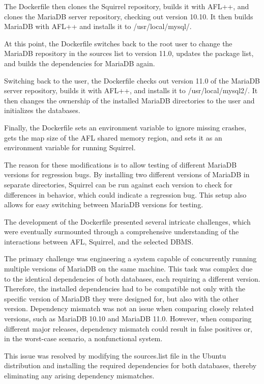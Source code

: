 \documentclass[sigconf]{acmart}
\begin{document}
The Dockerfile then clones the Squirrel repository, builds it with AFL++, and clones the MariaDB server repository, checking out version 10.10. It then builds MariaDB with AFL++ and installs it to /usr/local/mysql/.

At this point, the Dockerfile switches back to the root user to change the MariaDB repository in the sources list to version 11.0, updates the package list, and builds the dependencies for MariaDB again.

Switching back to the user, the Dockerfile checks out version 11.0 of the MariaDB server repository, builds it with AFL++, and installs it to /usr/local/mysql2/. It then changes the ownership of the installed MariaDB directories to the user and initializes the databases.

Finally, the Dockerfile sets an environment variable to ignore missing crashes, gets the map size of the AFL shared memory region, and sets it as an environment variable for running Squirrel.

The reason for these modifications is to allow testing of different MariaDB versions for regression bugs. By installing two different versions of MariaDB in separate directories, Squirrel can be run against each version to check for differences in behavior, which could indicate a regression bug. This setup also allows for easy switching between MariaDB versions for testing.

The development of the Dockerfile presented several intricate challenges, which were eventually surmounted through a comprehensive understanding of the interactions between AFL, Squirrel, and the selected DBMS.

The primary challenge was engineering a system capable of concurrently running multiple versions of MariaDB on the same machine. This task was complex due to the identical dependencies of both databases, each requiring a different version. Therefore, the installed dependencies had to be compatible not only with the specific version of MariaDB they were designed for, but also with the other version. Dependency mismatch was not an issue when comparing closely related versions, such as MariaDB 10.10 and MariaDB 11.0. However, when comparing different major releases, dependency mismatch could result in false positives or, in the worst-case scenario, a nonfunctional system.

This issue was resolved by modifying the sources.list file in the Ubuntu distribution and installing the required dependencies for both databases, thereby eliminating any arising dependency mismatches.
\end{document}
